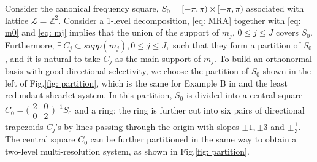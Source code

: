 Consider the canonical frequency square, $S_0 = [-\pi,\pi)\times[-\pi,\pi)$ associated with lattice $\mathcal{L} = \mathbb{Z}^2$. 
Consider a 1-level decomposition, \eqref{eq: MRA} together with \eqref{eq: m0} and \eqref{eq: mj} implies that the union of the support of $m_j,\,0\leq j\leq J$ covers $S_0$.
Furthermore, $\exists\, C_j\subset supp(m_j), 0\leq j\leq J,$ such that they form a partition of $S_0$, and it is natural to take $C_j$ as the main support of $m_j$.
To build an orthonormal basis with good directional selectivity, we choose the partition of $S_0$ shown in the left of Fig.\ref{fig: partition}, which is the same for Example B in \cite{durand2007} and the least redundant shearlet system. In this partition, $S_0$ is divided into a central square $C_0 = \bigl(\begin{smallmatrix} 2&0\\0&2\end{smallmatrix}\bigr)^{-1}S_0$ and a ring: the ring is further cut into six pairs of directional trapezoids $C_j$'s by lines passing through the origin with slopes $\pm 1, \pm 3$ and $\pm \frac{1}{3}$. The central square $C_0$ can be further partitioned in the same way to obtain a two-level multi-resolution system, as shown in Fig.\ref{fig: partition}. 




